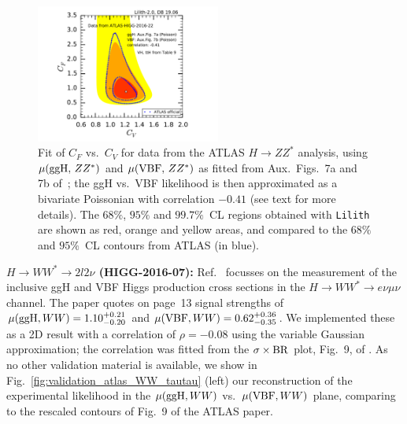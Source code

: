 \begin{figure}[h!]\centering
\includegraphics[width=0.54\textwidth]{validation/ATLAS/HIGG-2016-22-CVCF-fitted.pdf}%
\vspace*{-2mm}
\caption{Fit of $C_F$ vs.\ $C_V$ for data from the ATLAS $H\to ZZ^*$ analysis, 
using $\mu({\rm ggH},\,ZZ^*)$ and $\mu({\rm VBF},\,ZZ^*)$ as fitted from Aux.\ Figs.~7a and 7b of~\cite{Aaboud:2017vzb}; 
the ggH vs.\ VBF likelihood is then approximated as a bivariate Poissonian with correlation $-0.41$ (see text for more details). 
The $68\%$,  $95\%$ and $99.7\%$~CL regions obtained with {\tt Lilith} are shown as red, orange and yellow areas, 
and compared to the $68\%$ and  $95\%$~CL contours from ATLAS (in blue).}
\label{fig:validation_atlas_ZZ}
\end{figure}


{\bf\boldmath $H\to WW^*\to 2l2\nu$ (HIGG-2016-07):} Ref.~\cite{Aaboud:2018jqu} focusses on the measurement of the 
inclusive ggH and VBF Higgs production cross sections in the $H\to WW^*\to e\nu\mu\nu$ channel. The paper quotes 
on page~13 signal strengths of $\mu({\rm ggH}, WW)=1.10^{+0.21}_{-0.20}$ and $\mu({\rm VBF}, WW)=0.62^{+0.36}_{-0.35}$. 
We implemented these as a 2D result with a correlation of $\rho=-0.08$ using the variable Gaussian approximation; 
the correlation was fitted from the $\sigma\times{\rm BR}$ plot, Fig.~9, of \cite{Aaboud:2018jqu}. 
As no other validation material is available, 
we show in Fig.~\ref{fig:validation_atlas_WW_tautau} (left) our reconstruction of the experimental likelihood in the 
$\mu({\rm ggH}, WW)$ vs.\ $\mu({\rm VBF}, WW)$ plane, comparing to the rescaled contours of Fig.~9 of the ATLAS paper.\\

